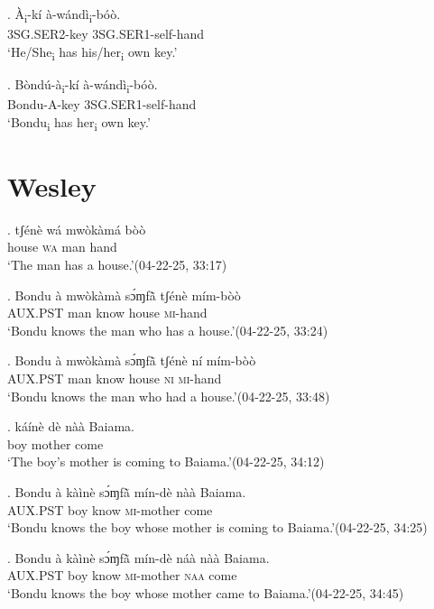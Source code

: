 \documentclass{assets/fieldnotes}
\begin{document}
\exg. \`{A}\textsubscript{i}-k\'{i} \`{a}-w\'{a}nd\`{i}\textsubscript{i}-b\'{o}\`{o}. \\
3SG.SER2-key 3SG.SER1-self-hand \\
`He/She\textsubscript{i} has his/her\textsubscript{i} own key.' 

\exg. B\`{o}nd\'{u}-\`{a}\textsubscript{i}-k\'{i} \`{a}-w\'{a}nd\`{i}\textsubscript{i}-b\'{o}\`{o}. \\
Bondu-A-key 3SG.SER1-self-hand \\
`Bondu\textsubscript{i} has her\textsubscript{i} own key.'

\section{Wesley}


\exg. tʃénè wá mwòkàmá bòò\\
house \textsc{wa} man hand\\
`The man has a house.’\hfill{(04-22-25, 33:17)}

\exg. Bondu à mwòkàmà sɔ́ɱfã̀ tʃénè mím-bòò\\
{} \textsc{AUX.PST} man know house \textsc{mi}-hand\\
`Bondu knows the man who has a house.’\hfill{(04-22-25, 33:24)}\\

\exg. Bondu à mwòkàmà sɔ́ɱfã̀ tʃénè ní mím-bòò\\
{} \textsc{AUX.PST} man know house \textsc{ni} \textsc{mi}-hand\\
`Bondu knows the man who had a house.’\hfill{(04-22-25, 33:48)}


\exg. káínè dè nàà Baiama.\\
boy mother come {}\\
`The boy’s mother is coming to Baiama.’\hfill{(04-22-25, 34:12)}

\exg. Bondu à kàìnè sɔ́ɱfã̀ mín-dè nàà Baiama.\\
{} \textsc{AUX.PST} boy know \textsc{mi}-mother come {}\\
`Bondu knows the boy whose mother is coming to Baiama.’\hfill{(04-22-25, 34:25)}

\exg. Bondu à kàìnè sɔ́ɱfã̀ mín-dè náà nàà Baiama.\\
{} \textsc{AUX.PST} boy know \textsc{mi}-mother \textsc{naa} come {}\\
`Bondu knows the boy whose mother came to Baiama.’\hfill{(04-22-25, 34:45)}
\end{document}

